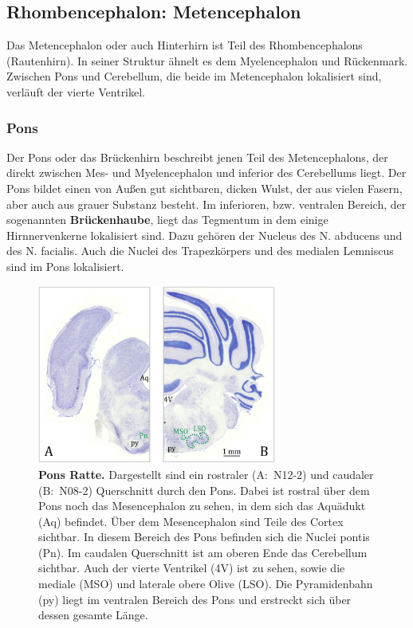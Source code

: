 
\subsection{Rhombencephalon: Metencephalon}
\label{subsec:Metencephalon} 

Das Metencephalon oder auch Hinterhirn ist Teil des Rhombencephalons (Rautenhirn). In seiner Struktur ähnelt es dem Myelencephalon und Rückenmark. Zwischen Pons und Cerebellum, die beide im Metencephalon lokalisiert sind, verläuft der vierte Ventrikel.


\subsubsection{Pons}
\label{subsubsec:Pons} 

Der Pons oder das Brückenhirn beschreibt jenen Teil des Metencephalons, der direkt zwischen Mes- und Myelencephalon und inferior des Cerebellums liegt. Der Pons bildet einen von Außen gut sichtbaren, dicken Wulst, der aus vielen Fasern, aber auch aus grauer Substanz besteht. Im inferioren, bzw. ventralen Bereich, der sogenannten \textbf{Brückenhaube}, liegt das Tegmentum in dem einige Hirnnervenkerne lokalisiert sind. Dazu gehören der Nucleus des N. abducens und des N. facialis. Auch die Nuclei des Trapezkörpers und des medialen Lemniscus sind im Pons lokalisiert.

\begin{figure}[H]
    \centering
    \includegraphics[width=0.7\textwidth]{pictures/Bilder_Jule/Ratte/pons.png}
    \caption[Pons Ratte]{\textbf{Pons Ratte.} Dargestellt sind ein rostraler (A:~N12-2) und caudaler (B:~N08-2) Querschnitt durch den Pons. Dabei ist rostral über dem Pons noch das Mesencephalon zu sehen, in dem sich das Aquädukt (Aq) befindet. Über dem Mesencephalon sind Teile des Cortex sichtbar. In diesem Bereich des Pons befinden sich die Nuclei pontis (Pn). Im caudalen Querschnitt ist am oberen Ende das Cerebellum sichtbar. Auch der vierte Ventrikel (4V) ist zu sehen, sowie die mediale (MSO) und laterale obere Olive (LSO). Die Pyramidenbahn (py) liegt im ventralen Bereich des Pons und erstreckt sich über dessen gesamte Länge.}
    \label{fig:pons_ratte}
\end{figure}{}

